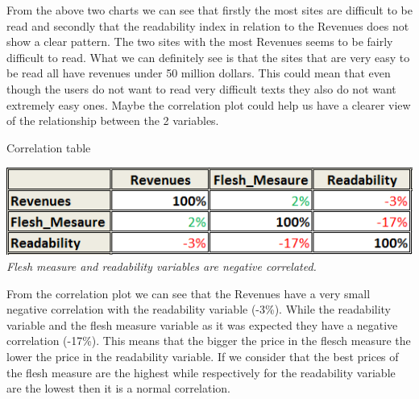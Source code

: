 \documentclass{book}
\begin{document}
From the above two charts we can see that firstly the most sites are difficult to be read and secondly that the readability index in relation to the Revenues does not show a clear pattern. The two sites with the most Revenues seems to be fairly difficult to read. What we can definitely see is that the sites that are very easy to be read all have revenues under 50 million dollars. This could mean that even though the users do not want to read very difficult texts they also do not want extremely easy ones. Maybe the correlation plot could help us have a clearer view of the relationship between the 2 variables.
\begin{table}[H]
\centering
\caption{Correlation table}
\begin{center}
\includegraphics[scale=0.7]{../R/photos/43b_read_cor.png}    \\
\textit{Flesh measure and readability variables are negative correlated.}
\end{center}
\end{table}
From the correlation plot we can see that the Revenues have a very small negative correlation with the readability variable (-3\%). While the readability variable and the flesh measure variable as it was expected they have a negative correlation (-17\%). This means that the bigger the price in the flesch measure the lower the price in the readability variable. If we consider that the best prices of the flesh measure are the highest while respectively for the readability variable are the lowest then it is a normal correlation.
\end{document}
